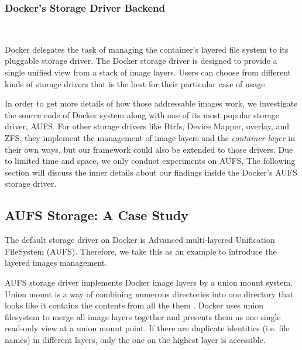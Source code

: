 
\smallbreak
\subsubsection{Docker's Storage Driver Backend}
~\smallbreak

Docker delegates the task of managing the container's layered file system to its pluggable storage driver. 
The Docker storage driver is designed to provide a single unified view from a stack of image layers.
Users can choose from different kinds of storage drivers that is the best for their particular case of usage. 



In order to get more details of how those addressable images work, we investigate the source code of Docker system along with one of its most popular storage driver, AUFS. 
For other storage drivers like Btrfs, Device Mapper, overlay, and ZFS, they implement the management of image layers and the \textit{container layer} in their own ways, but our framework could also be extended to those drivers. Due to limited time and space, we only conduct experiments on AUFS. The following section will discuss the inner details about our findings inside the Docker's AUFS storage driver.



\subsection{AUFS Storage: A Case Study}
The default storage driver on Docker is Advanced multi-layered Unification FileSystem (AUFS). Therefore, we take this as an example to introduce the layered images management.

AUFS storage driver implements Docker image layers by a union mount system. Union mount is a way of combining numerous directories into one directory that looks like it contains the contents from all the them \cite{aufs}. Docker uses union filesystem to merge all image layers together and presents them as one single read-only view at a union mount point. If there are duplicate identities (i.e. file names) in different layers, only the one on the highest layer is accessible.

